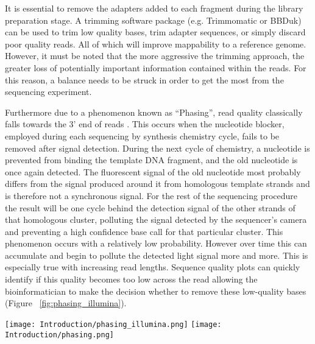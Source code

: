 It is essential to remove the adapters added to each fragment during the library preparation stage. A trimming software package (e.g. Trimmomatic or BBDuk) can be used to trim low quality bases, trim adapter sequences, or simply discard poor quality reads. All of which will improve mappability to a reference genome. However, it must be noted that the more aggressive the trimming approach, the greater loss of potentially important information contained within the reads. For this reason, a balance needs to be struck in order to get the most from the sequencing experiment. 

Furthermore due to a phenomenon known as “Phasing”, read quality classically falls towards the 3’ end of reads \cite{EcSeq2017}. This occurs when the nucleotide blocker, employed during each sequencing by synthesis chemistry cycle, fails to be removed after signal detection. During the next cycle of chemistry, a nucleotide is prevented from binding the template DNA fragment, and the old nucleotide is once again detected. The fluorescent signal of the old nucleotide most probably differs from the signal produced around it from homologous template strands and is therefore not a synchronous signal. For the rest of the sequencing procedure the result will be one cycle behind the detection signal of the other strands of that homologous cluster, polluting the signal detected by the sequencer's camera and preventing a high confidence base call for that particular cluster. This phenomenon occurs with a relatively low probability. However over time this can accumulate and begin to pollute the detected light signal more and more. This is especially true with increasing read lengths. Sequence quality plots can quickly identify if this quality becomes too low across the read allowing the bioinformatician to make the decision whether to remove these low-quality bases (Figure ~\ref{fig:phasing_illumina}).

\begin{figure*}[!htbp]
\centering
\texttt{[image: Introduction/phasing\_illumina.png]}
\texttt{[image: Introduction/phasing.png]}
\caption[Phasing Phenomenon observed within Illumina's Sequencing by Synthesis technology]{Phasing Phenomenon observed within Illumina's Sequencing by Synthesis technology (Illumina, Inc. - San Diego, CA, USA). Phasing occurs when a blocker nucleotide is not removed during one of the chemistry cycles of the experiment (Above, Image taken from ECSeq Bioinformatics \cite{EcSeq2017}). Downstream signal is therefore asynchronous within the homologous cluster, and leads to a decreasing confidence in accurate base calling, as represented by a reduction in Phred score (Below, BoxWhisker type plot generated by FASTQC (v0.11.7) \cite{Andrews2010}).}
\label{fig:phasing_illumina}
\end{figure*}

